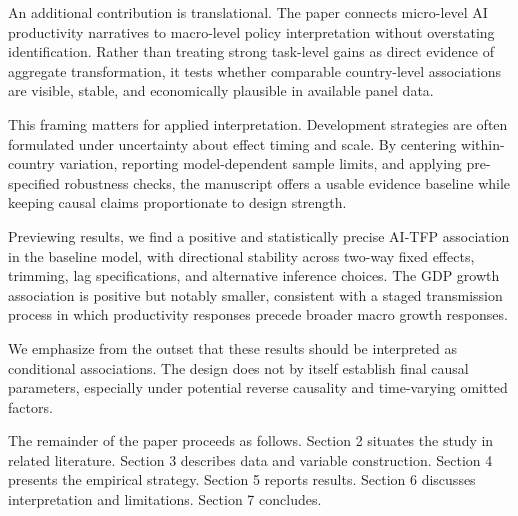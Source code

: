 An additional contribution is translational. The paper connects micro-level AI productivity narratives to macro-level policy interpretation without overstating identification. Rather than treating strong task-level gains as direct evidence of aggregate transformation, it tests whether comparable country-level associations are visible, stable, and economically plausible in available panel data.

This framing matters for applied interpretation. Development strategies are often formulated under uncertainty about effect timing and scale. By centering within-country variation, reporting model-dependent sample limits, and applying pre-specified robustness checks, the manuscript offers a usable evidence baseline while keeping causal claims proportionate to design strength.

Previewing results, we find a positive and statistically precise AI-TFP association in the baseline model, with directional stability across two-way fixed effects, trimming, lag specifications, and alternative inference choices. The GDP growth association is positive but notably smaller, consistent with a staged transmission process in which productivity responses precede broader macro growth responses.

We emphasize from the outset that these results should be interpreted as conditional associations. The design does not by itself establish final causal parameters, especially under potential reverse causality and time-varying omitted factors.

The remainder of the paper proceeds as follows. Section 2 situates the study in related literature. Section 3 describes data and variable construction. Section 4 presents the empirical strategy. Section 5 reports results. Section 6 discusses interpretation and limitations. Section 7 concludes.
